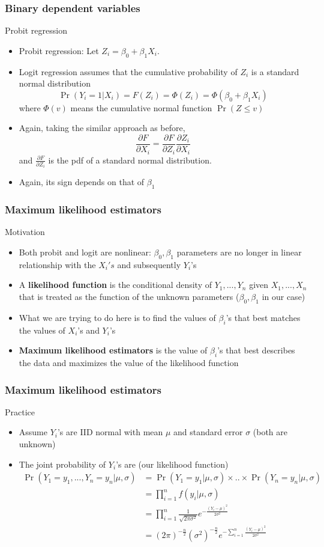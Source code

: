 \documentclass[compress]{beamer}
\begin{document}
\begin{frame}
\frametitle{Binary dependent variables}
Probit regression
\begin{itemize}
\item Probit regression: Let $Z_i=\beta_0+\beta_1X_i$. 
\item Logit regression assumes that the cumulative probability of $Z_i$ is a standard normal distribution
\[
\Pr(Y_i=1|X_i)=F(Z_i)=\Phi(Z_i)=\Phi(\beta_0+\beta_1X_i)
\]
where $\Phi(v)$ means the cumulative normal function $\Pr(Z\leq v)$
\item Again, taking the similar approach as before, 
\[
\frac{\partial F}{\partial X_i} = \frac{\partial F}{\partial Z_i}\frac{\partial Z_i}{\partial X_i} 
\]
and $\frac{\partial F}{\partial Z_i}$ is the pdf of a standard normal distribution.
\item Again, its sign depends on that of $\beta_1$
\end{itemize}
\end{frame}

\begin{frame}
\frametitle{Maximum likelihood estimators}
Motivation
\begin{itemize}
\item Both probit and logit are nonlinear: $\beta_0, \beta_1$ parameters are no longer in linear relationship with the $X_i's$ and subsequently $Y_i$'s
\item A \textbf{likelihood function} is the conditional density of $Y_1,...,Y_n$ given $X_1,...,X_n$ that is treated as the function of the unknown parameters ($\beta_0, \beta_1$ in our case)
\item What we are trying to do here is to find the values of $\beta_i$'s that best matches the values of $X_i$'s and $Y_i$'s
\item \textbf{Maximum likelihood estimators} is the value of $\beta_i$'s that best describes the data and maximizes the value of the likelihood function
\end{itemize}
\end{frame}

\begin{frame}
\frametitle{Maximum likelihood estimators}
Practice
\begin{itemize}
\item Assume $Y_i$'s are IID normal with mean $\mu$ and standard error $\sigma$ (both are unknown)
\item The joint probability of $Y_i$'s are (our likelihood function)
\[
\begin{aligned}
\Pr(Y_1=y_1,...,Y_n=y_n|\mu,\sigma)&=\Pr(Y_1 = y_1|\mu,\sigma)\times..\times\Pr(Y_n=y_n|\mu,\sigma)\\
&=\prod_{i=1}^nf(y_i|\mu,\sigma)\\
&=\prod_{i=1}^n\frac{1}{\sqrt{2\pi\sigma^2}}e^{-\frac{(Y_i-\mu)^2}{2\sigma^2}}\\
&=(2\pi)^{-\frac{n}{2}} (\sigma^2)^{-\frac{n}{2}}e^{-\sum_{i=1}^n\frac{(Y_i-\mu)^2}{2\sigma^2}}\\
\end{aligned}
\]
\end{itemize}
\end{frame}
\end{document}
